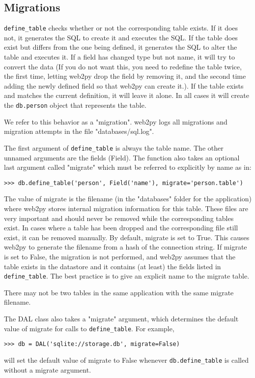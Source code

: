 \documentclass[justified,sixbynine,notoc]{tufte-book}
\def\ft{\small\tt}
\def\inxx#1{\index{#1}}
\begin{document}
\begin{fullwidth}
\goodbreak\section{Migrations}

\inxx{migrations}

{\ft define\_table} checks whether or not the corresponding table exists. If it does not, it generates the SQL to create it and executes the SQL. If the table does exist but differs from the one being defined, it generates the SQL to alter the table and executes it. If a field has changed type but not name, it will try to convert the data (If you do not want this, you need to redefine the table twice, the first time, letting web2py drop the field by removing it, and the second time adding the newly defined field so that web2py can create it.). If the table exists and matches the current definition, it will leave it alone. In all cases it will create the {\ft db.person} object that represents the table.

We refer to this behavior as a "migration". web2py logs all migrations and migration attempts in the file "databases/sql.log".

The first argument of {\ft define\_table} is always the table name. The other unnamed arguments are the fields (Field). The function also takes an optional last argument called "migrate" which must be referred to explicitly by name as in:
\begin{lstlisting}
>>> db.define_table('person', Field('name'), migrate='person.table')
\end{lstlisting}

The value of migrate is the filename (in the "databases" folder for the application) where web2py stores internal migration information for this table.
These files are very important and should never be removed while the corresponding tables exist.  In cases where a table has been dropped and the corresponding file still exist, it can be removed manually. By default, migrate is set to True. This causes web2py to generate the filename from a hash of the connection string. If migrate is set to False, the migration is not performed, and web2py assumes that the table exists in the datastore and it contains (at least) the fields listed in {\ft define\_table}.
The best practice is to give an explicit name to the migrate table.

There may not be two tables in the same application with the same migrate filename.

The DAL class also takes a "migrate" argument, which determines the default value of migrate for calls to {\ft define\_table}. For example,
\begin{lstlisting}
>>> db = DAL('sqlite://storage.db', migrate=False)
\end{lstlisting}
\noindent will set the default value of migrate to False whenever {\ft db.define\_table} is called without a migrate argument.


\end{fullwidth}
\end{document}
